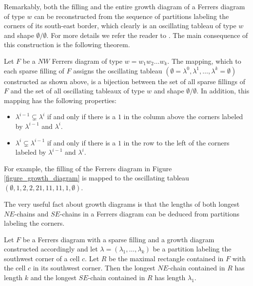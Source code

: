 Remarkably, both the filling and the entire growth diagram of a Ferrers diagram of type $w$ can be reconstructed from
the sequence of partitions labeling the corners of its south-east border, which clearly is an oscillating tableau
of type $w$ and shape $\emptyset/\emptyset$. For more details we refer the reader to \cite[Section 2]{Krattenthaler06}.
The main consequence of this construction is the following theorem.

\begin{thm} \label{thm_krat_1}
Let $F$ be a $NW$ Ferrers diagram of type $w = w_1w_2\ldots w_k$. The mapping, which to each sparse filling of $F$
assigns the oscillating tableau $(\emptyset = \lambda^0, \lambda^1, \ldots, \lambda^k = \emptyset)$
constructed as shown above, is a bijection between the set of all sparse fillings of $F$
and the set of all oscillating tableaux of type $w$ and shape $\emptyset/\emptyset$. In addition, this mapping has the following properties:
\begin{itemize}
\item $\lambda^{i-1} \subsetneq \lambda^i$ if and only if there is a $1$ in the column above the corners labeled by $\lambda^{i-1}$
and $\lambda^{i}$.
\item $\lambda^{i} \subsetneq \lambda^{i-1}$ if and only if there is a $1$ in the row to the left of the corners labeled by $\lambda^{i-1}$
and $\lambda^{i}$.
\end{itemize}
\end{thm}

For example, the filling of the Ferrers diagram in Figure \ref{figure_growth_diagram} is mapped to the oscillating tableau
$(\emptyset, 1, 2, 2, 21, 11, 11, 1, \emptyset)$. 

The very useful fact about growth diagrams 
is that the lengths of both longest $NE$-chains and $SE$-chains in a Ferrers
diagram can be deduced from partitions labeling the corners.

\begin{thm} \label{thm_greene}
Let $F$ be a Ferrers diagram with a sparse filling and a growth diagram constructed accordingly and let $\lambda = (\lambda_1, \ldots, \lambda_k)$
be a partition labeling the southwest corner of a cell $c$. 
Let $R$ be the maximal rectangle contained in $F$ with the cell $c$ in its southwest corner.
Then the longest $NE$-chain contained in $R$ has length $k$ and the longest $SE$-chain contained in $R$ has length $\lambda_1$.
\end{thm}

